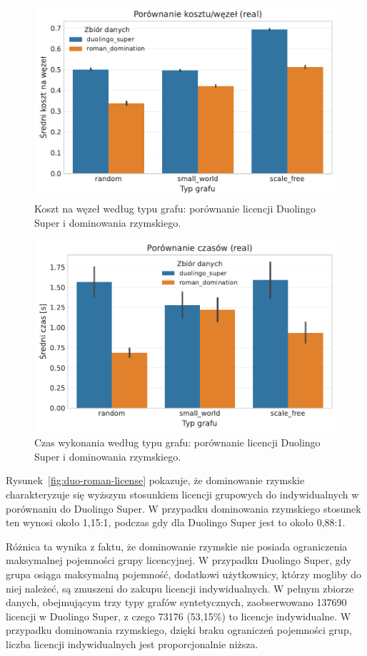 \begin{figure}[H]
  \centering
  \includegraphics[width=0.6\linewidth]{assets/figures/benchmark/real/duo_vs_roman_cost_per_node_by_graph.pdf}
  \caption{Koszt na węzeł według typu grafu: porównanie licencji Duolingo Super i dominowania rzymskiego.}
  \label{fig:duo-roman-cost}
\end{figure}

\begin{figure}[H]
  \centering
  \includegraphics[width=0.6\linewidth]{assets/figures/benchmark/real/duo_vs_roman_time_by_graph.pdf}
  \caption{Czas wykonania według typu grafu: porównanie licencji Duolingo Super i dominowania rzymskiego.}
  \label{fig:duo-roman-time}
\end{figure}

Rysunek~\ref{fig:duo-roman-license} pokazuje, że dominowanie rzymskie charakteryzuje się wyższym stosunkiem licencji grupowych do indywidualnych w porównaniu do Duolingo Super. W przypadku dominowania rzymskiego stosunek ten wynosi około 1,15:1, podczas gdy dla Duolingo Super jest to około 0,88:1.

Różnica ta wynika z faktu, że dominowanie rzymskie nie posiada ograniczenia maksymalnej pojemności grupy licencyjnej. W przypadku Duolingo Super, gdy grupa osiąga maksymalną pojemność, dodatkowi użytkownicy, którzy mogliby do niej należeć, są zmuszeni do zakupu licencji indywidualnych. W pełnym zbiorze danych, obejmującym trzy typy grafów syntetycznych, zaobserwowano 137690 licencji w Duolingo Super, z czego 73176 (53,15\%) to licencje indywidualne. W przypadku dominowania rzymskiego, dzięki braku ograniczeń pojemności grup, liczba licencji indywidualnych jest proporcjonalnie niższa.

